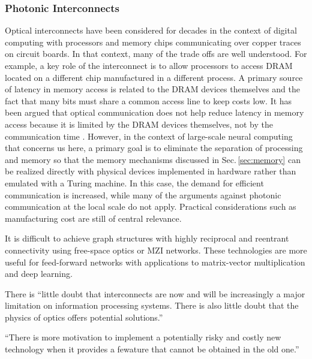 \subsubsection{Photonic Interconnects}
\vspace{3em}
Optical interconnects have been considered for decades in the context of digital computing with processors and memory chips communicating over copper traces on circuit boards. In that context, many of the trade offs are well understood. For example, a key role of the interconnect is to allow processors to access DRAM located on a different chip manufactured in a different process. A primary source of latency in memory access is related to the DRAM devices themselves and the fact that many bits must share a common access line to keep costs low. It has been argued that optical communication does not help reduce latency in memory access because it is limited by the DRAM devices themselves, not by the communication time \cite{husz2003}. However, in the context of large-scale neural computing that concerns us here, a primary goal is to eliminate the separation of processing and memory so that the memory mechanisms discussed in Sec.\,\ref{sec:memory} can be realized directly with physical devices implemented in hardware rather than emulated with a Turing machine. In this case, the demand for efficient communication is increased, while many of the arguments against photonic communication at the local scale do not apply. Practical considerations such as manufacturing cost are still of central relevance.

\vspace{3em}
It is difficult to achieve graph structures with highly reciprocal and reentrant connectivity using free-space optics or MZI networks. These technologies are more useful for feed-forward networks with applications to matrix-vector multiplication and deep learning.
 

\vspace{3em}
There is ``little doubt that interconnects are now and will be increasingly a major limitation on information processing systems. There is also little doubt that the physics of optics offers potential solutions.'' \cite{mi2009}

\vspace{3em}
``There is more motivation to implement a potentially risky and costly new technology when it provides a fewature that cannot be obtained in the old one.'' \cite{husz2003}

